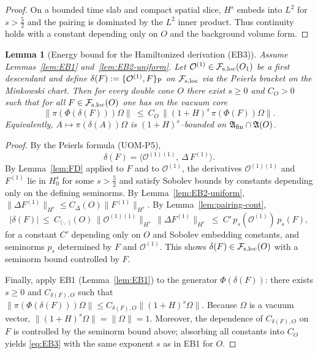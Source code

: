 \documentclass[10pt]{article}
\newcommand{\Fsloc}{\mathcal F_{\rm s.loc}}
\theoremstyle{definition}
\theoremstyle{plain}
\newtheorem{lemma}{Lemma}[section]
\begin{document}
\begin{proof}
On a bounded time slab and compact spatial slice, $H^s$ embeds into $L^2$ for $s>\frac52$ and the pairing is dominated by the $L^2$ inner product.
Thus continuity holds with a constant depending only on $O$ and the background volume form.
\end{proof}

\begin{lemma}[Energy bound for the Hamiltonized derivation (EB3)]
\label{lem:EB3}
Assume Lemmas~\ref{lem:EB1} and~\ref{lem:EB2-uniform}.  Let $\mathcal O^{(1)}\in\Fsloc(O_1)$ be a first descendant and define
$\delta(F):=\{\mathcal O^{(1)},F\}_{\rm P}$ on $\Fsloc$ via the Peierls bracket on the Minkowski chart.
Then for every double cone $O$ there exist $s\ge 0$ and $C_{O}>0$ such that for all $F\in\Fsloc(O)$ one has on the vacuum core
\begin{equation}
\|\pi(\Phi(\delta(F)))\Omega\|\ \le\ C_O\,\|(1+H)^s\,\pi(\Phi(F))\Omega\|.
\label{eq:EB3}
\end{equation}
Equivalently, $A\mapsto \pi(\delta(A))\Omega$ is $(1+H)^s$--bounded on $\mathfrak A_{\rm fin}\cap\mathfrak A(O)$.
\end{lemma}

\begin{proof}
By the Peierls formula (UOM-P5),
\[
\delta(F)=\langle \mathcal O^{(1)(1)},\,\Delta\,F^{(1)}\rangle.
\]
By Lemma~\ref{lem:FD} applied to $F$ and to $\mathcal O^{(1)}$, the derivatives $\mathcal O^{(1)(1)}$ and $F^{(1)}$ lie in $H^s_0$ for some
$s>\frac52$ and satisfy Sobolev bounds by constants depending only on the defining seminorms.
By Lemma~\ref{lem:EB2-uniform}, $\|\Delta F^{(1)}\|_{H^s}\le C_\Delta(O)\|F^{(1)}\|_{H^s}$.  By Lemma~\ref{lem:pairing-cont},
\[
|\delta(F)|\ \le\ C_{\langle\cdot,\cdot\rangle}(O)\,\|\mathcal O^{(1)(1)}\|_{H^s}\,\|\Delta F^{(1)}\|_{H^s}
\ \le\ C'\,p_s(\mathcal O^{(1)})\,p_s(F),
\]
for a constant $C'$ depending only on $O$ and Sobolev embedding constants, and seminorms $p_s$ determined by $F$ and $\mathcal O^{(1)}$.
This shows $\delta(F)\in \Fsloc(O)$ with a seminorm bound controlled by $F$.

Finally, apply EB1 (Lemma~\ref{lem:EB1}) to the generator $\Phi(\delta(F))$:
there exists $s\ge 0$ and $C_{\delta(F),O}$ such that
\(
\|\pi(\Phi(\delta(F)))\Omega\|\le C_{\delta(F),O}\|(1+H)^s\Omega\|.
\)
Because $\Omega$ is a vacuum vector, $\|(1+H)^s\Omega\|=\|\Omega\|=1$.
Moreover, the dependence of $C_{\delta(F),O}$ on $F$ is controlled by the seminorm bound above; absorbing all constants into $C_O$ yields
\eqref{eq:EB3} with the same exponent $s$ as in EB1 for $O$.
\end{proof}
\end{document}

